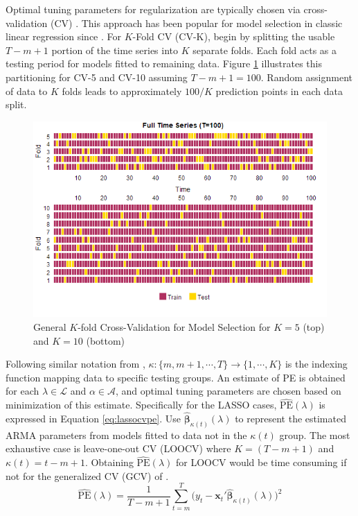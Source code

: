 Optimal tuning parameters for regularization are typically chosen via cross-validation (CV) \citep{Hastie2009a}. This approach has been popular for model selection in classic linear regression since \cite{Stone1974}. For $K$-Fold CV (CV-K), begin by splitting the usable $T-m+1$ portion of the time series into $K$ separate folds. Each fold acts as a testing period for models fitted to remaining data. Figure \ref{fig:kcvplots} illustrates this partitioning for CV-5 and CV-10 assuming $T-m+1=100$. Random assignment of data to $K$ folds leads to approximately $100/K$ prediction points in each data split.
\begin{figure}[htbp!]
	\caption{General $K$-fold Cross-Validation for Model Selection for $K=5$ (top) and $K=10$ (bottom)}
	\center
	\label{fig:kcvplots}
	\includegraphics[scale=0.58]{kcvplots}
\end{figure}

Following similar notation from \cite{Hastie2009a}, $\kappa:\{m,m+1,\cdots,T\}\to\{1,\cdots,K\}$ is the indexing function mapping data to specific testing groups. An estimate of PE is obtained for each $\lambda \in \mathcal{L}$ and $\alpha \in \mathcal{A}$, and optimal tuning parameters are chosen based on minimization of this estimate. Specifically for the LASSO cases, $\widehat{\textrm{PE}}(\lambda)$ is expressed in Equation \ref{eq:lassocvpe}. Use $\hat{\bm{\beta}}_{\kappa(t)}(\lambda)$ to represent the estimated ARMA parameters from models fitted to data not in the $\kappa(t)$ group. The most exhaustive case is leave-one-out CV (LOOCV) where $K=(T-m+1)$ and  $\kappa(t)=t-m+1$. Obtaining $\widehat{\textrm{PE}}(\lambda)$ for LOOCV would be time consuming if not for the generalized CV (GCV) of \cite{Wahba1978}.
\begin{equation}
\label{eq:lassocvpe}
	\widehat{\textrm{PE}}(\lambda)=\frac{1}{T-m+1}\sum\limits_{t=m}^T \bigg(y_t-\bm{x}_t'\hat{\bm{\beta}}_{\kappa(t)}(\lambda)\bigg)^2
\end{equation}



